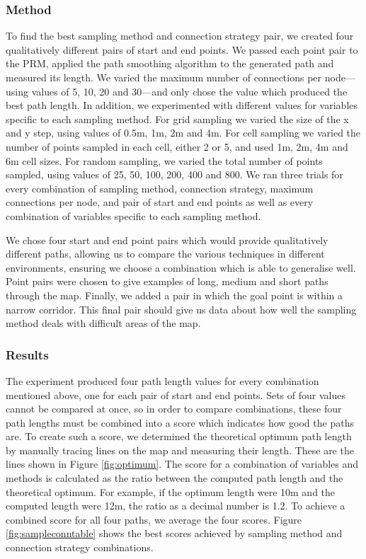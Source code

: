 \documentclass[conference]{IEEEtran}
\begin{document}
\subsubsection{Method}
To find the best sampling method and connection strategy pair, we created four qualitatively different pairs of start and end points. We passed each point pair to the PRM, applied the path smoothing algorithm to the generated path and measured its length. We varied the maximum number of connections per node---using values of 5, 10, 20 and 30---and only chose the value which produced the best path length. In addition, we experimented with different values for variables specific to each sampling method. For grid sampling we varied the size of the x and y step, using values of 0.5m, 1m, 2m and 4m. For cell sampling we varied the number of points sampled in each cell, either 2 or 5, and used 1m, 2m, 4m and 6m cell sizes. For random sampling, we varied the total number of points sampled, using values of 25, 50, 100, 200, 400 and 800. We ran three trials for every combination of sampling method, connection strategy, maximum connections per node, and pair of start and end points as well as every combination of variables specific to each sampling method.

We chose four start and end point pairs which would provide qualitatively different paths, allowing us to compare the various techniques in different environments, ensuring we choose a combination which is able to generalise well. Point pairs were chosen to give examples of long, medium and short paths through the map. Finally, we added a pair in which the goal point is within a narrow corridor. This final pair should give us data about how well the sampling method deals with difficult areas of the map.

\subsubsection{Results}
The experiment produced four path length values for every combination mentioned above, one for each pair of start and end points. Sets of four values cannot be compared at once, so in order to compare combinations, these four path lengths must be combined into a score which indicates how good the paths are. To create such a score, we determined the theoretical optimum path length by manually tracing lines on the map and measuring their length. These are the lines shown in Figure \ref{fig:optimum}. The score for a combination of variables and methods is calculated as the ratio between the computed path length and the theoretical optimum. For example, if the optimum length were 10m and the computed length were 12m, the ratio as a decimal number is 1.2. To achieve a combined score for all four paths, we average the four scores. Figure \ref{fig:sampleconntable} shows the best scores achieved by sampling method and connection strategy combinations.
\end{document}
